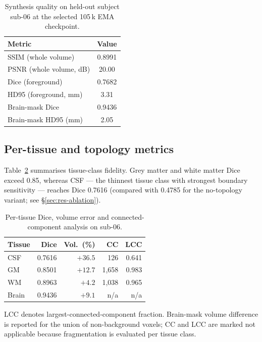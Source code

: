 \documentclass[10pt,twocolumn,a4paper]{article}
\begin{document}
\begin{table}[!t]
\caption{Synthesis quality on held-out subject sub-06 at the
selected 105\,k EMA checkpoint.}
\label{tab:paired-quality}
\centering
\small
\begin{tabular}{lc}
\toprule
Metric & Value \\
\midrule
SSIM (whole volume)              & 0.8991 \\
PSNR (whole volume, dB)          & 20.00 \\
Dice (foreground)                & 0.7682 \\
HD95 (foreground, mm)            & 3.31 \\
Brain-mask Dice                  & 0.9436 \\
Brain-mask HD95 (mm)             & 2.05 \\
\bottomrule
\end{tabular}
\end{table}

\subsection{Per-tissue and topology metrics}
\label{sec:res-tissue}

Table~\ref{tab:tissue-dice} summarises tissue-class fidelity. Grey
matter and white matter Dice exceed 0.85, whereas CSF --- the thinnest
tissue class with strongest boundary sensitivity --- reaches Dice
0.7616 (compared with 0.4785 for the no-topology variant; see
\S\ref{sec:res-ablation}).

\begin{table}[!t]
\caption{Per-tissue Dice, volume error and connected-component
analysis on sub-06.}
\label{tab:tissue-dice}
\centering
\scriptsize
\setlength{\tabcolsep}{3pt}
\begin{tabular}{lrrrr}
\toprule
Tissue & Dice & Vol.\ (\%) & CC & LCC \\
\midrule
CSF   & 0.7616 & $+36.5$ &   126   & 0.641 \\
GM    & 0.8501 & $+12.7$ & 1{,}658 & 0.983 \\
WM    & 0.8963 & $+4.2$  & 1{,}038 & 0.965 \\
Brain & 0.9436 & $+9.1$  & n/a     & n/a   \\
\bottomrule
\end{tabular}
\end{table}

\noindent
LCC denotes largest-connected-component fraction. Brain-mask volume
difference is reported for the union of non-background voxels; CC and
LCC are marked not applicable because fragmentation is evaluated per
tissue class.
\end{document}
